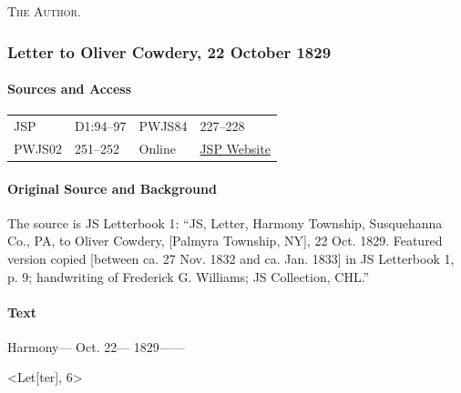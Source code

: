 				\begin{tightright}
					\textsc{The Author.}
				\end{tightright}
			
		\subsubsection{Letter to Oliver Cowdery, 22 October 1829}
			\label{EMS-1828-1829-JS-22-OCT-1829}
			
			\paragraph{Sources and Access}

				\begin{tabular}{p{1in}p{1.5in}p{1in}p{1.5in}}
				JSP	 	& D1:94--97		& PWJS84	& 227--228	 \\  
				PWJS02 	& 251--252	 	& 
				Online	& \href{https://www.josephsmithpapers.org/paper-summary/revelation-circa-summer-1829-dc-19/1}{JSP Website} \\
				\end{tabular}
			
			\paragraph{Original Source and Background}
			
				The source is JS Letterbook 1: ``JS, Letter, Harmony Township, Susquehanna Co., PA, to Oliver Cowdery, [Palmyra Township, NY], 22 Oct. 1829. Featured version copied [between ca. 27 Nov. 1832 and ca. Jan. 1833] in JS Letterbook 1, p. 9; handwriting of Frederick G. Williams; JS Collection, CHL.''
			
			\paragraph{Text}
			
				\begin{tightright}
					Harmony--- Oct. 22--- 1829------
				\end{tightright}
				
				<Let[ter], 6>
			
